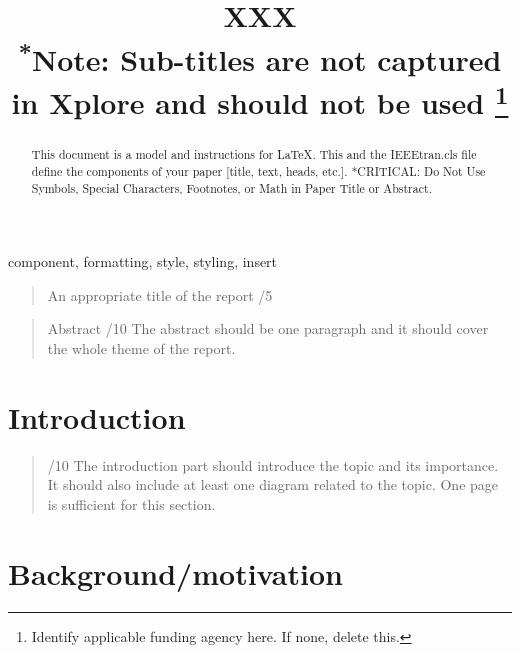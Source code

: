 \documentclass[conference]{IEEEtran}
\begin{document}
\title{XXX\\
{\footnotesize \textsuperscript{*}Note: Sub-titles are not captured in Xplore and
should not be used}
\thanks{Identify applicable funding agency here. If none, delete this.}
}

\author{
}

\maketitle

\begin{abstract}
This document is a model and instructions for \LaTeX.
This and the IEEEtran.cls file define the components of your paper [title, text, heads, etc.]. *CRITICAL: Do Not Use Symbols, Special Characters, Footnotes, 
or Math in Paper Title or Abstract.
\end{abstract}

\begin{IEEEkeywords}
component, formatting, style, styling, insert
\end{IEEEkeywords}

\begin{quote}
An appropriate title of the report /5
\end{quote}

\begin{quote}
Abstract /10 The abstract should be one paragraph and it should cover
the whole theme of the report.
\end{quote}

\hypertarget{introduction}{%
\section{Introduction}\label{introduction}}

\begin{quote}
/10 The introduction part should introduce the topic and its importance.
It should also include at least one diagram related to the topic. One
page is sufficient for this section.
\end{quote}

\hypertarget{backgroundmotivation}{%
\section{Background/motivation}\label{backgroundmotivation}}
\end{document}
